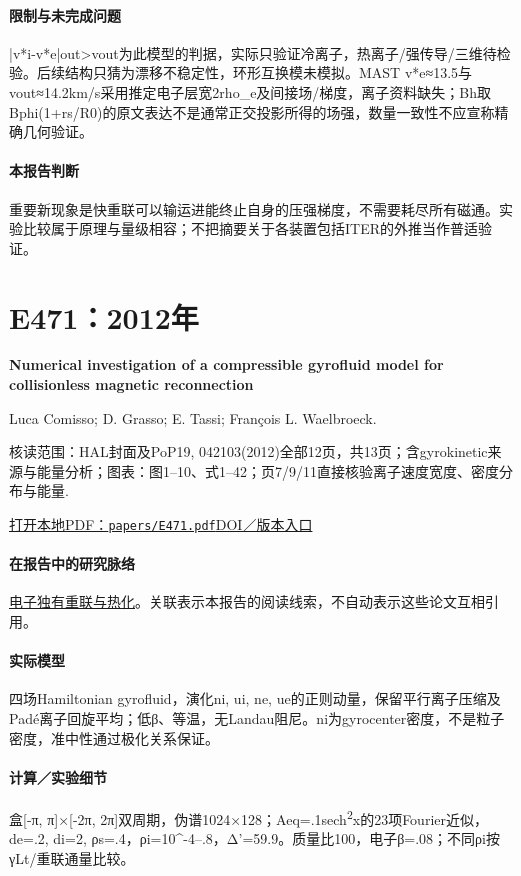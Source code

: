 \documentclass[UTF8,a4paper,11pt,openany,fontset=fandol]{ctexbook}
\begin{document}
\paragraph{限制与未完成问题}|v*i-v*e|out>vout为此模型的判据，实际只验证冷离子，热离子/强传导/三维待检验。后续结构只猜为漂移不稳定性，环形互换模未模拟。MAST v*e≈13.5与vout≈14.2km/s采用推定电子层宽2rho\_e及间接场/梯度，离子资料缺失；Bh取Bphi(1+rs/R0)的原文表达不是通常正交投影所得的场强，数量一致性不应宣称精确几何验证。

\paragraph{本报告判断}重要新现象是快重联可以输运进能终止自身的压强梯度，不需要耗尽所有磁通。实验比较属于原理与量级相容；不把摘要关于各装置包括ITER的外推当作普适验证。

\section{E471：2012年}\label{paper:E471}

\textbf{Numerical investigation of a compressible gyrofluid model for collisionless magnetic reconnection}\citep{E471}\

Luca Comisso;  D. Grasso;  E. Tassi;  François L. Waelbroeck.

\textsf{核读范围：}HAL封面及PoP19, 042103(2012)全部12页，共13页；含gyrokinetic来源与能量分析；\textsf{图表：}图1–10、式1–42；页7/9/11直接核验离子速度宽度、密度分布与能量.

\href{run:../papers/E471.pdf}{打开本地PDF：\texttt{papers/E471.pdf}}\quad\href{https://doi.org/10.1063/1.3697860}{DOI／版本入口}

\paragraph{在报告中的研究脉络}\hyperref[story:energy]{电子独有重联与热化}。关联表示本报告的阅读线索，不自动表示这些论文互相引用。

\paragraph{实际模型}四场Hamiltonian gyrofluid，演化ni, ui, ne, ue的正则动量，保留平行离子压缩及Padé离子回旋平均；低β、等温，无Landau阻尼。ni为gyrocenter密度，不是粒子密度，准中性通过极化关系保证。

\paragraph{计算／实验细节}盒[-π, π]×[-2π, 2π]双周期，伪谱1024×128；Aeq=.1sech\textsuperscript{2}x的23项Fourier近似，de=.2, di=2, ρs=.4，ρi=10\textasciicircum{}-4–.8，Δ'=59.9。质量比100，电子β=.08；不同ρi按γLt/重联通量比较。
\end{document}

